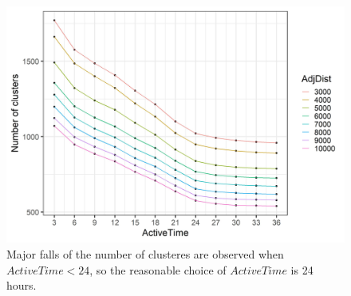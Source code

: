 \begin{Schunk}
\begin{figure}

{\centering \includegraphics[width=0.8\linewidth]{figures/clustering_tuning_2} 

}

\caption[Major falls of the number of clusteres are observed when $ActiveTime < 24$, so the reasonable choice of $ActiveTime$ is 24 hours]{Major falls of the number of clusteres are observed when $ActiveTime < 24$, so the reasonable choice of $ActiveTime$ is 24 hours.}\label{fig:vis2}
\end{figure}
\end{Schunk}




\address{%
Weihao Li\\
Monash University\\%
Econometrics and Business Statistics\\
%
%
%
\\\href{mailto:weihao.li@monash.edu}{\nolinkurl{weihao.li@monash.edu}}
}

\address{%
Emily Dodwell\\
??\\%
line 1\\ line 2\\
%
%
%
\\\href{mailto:emdodwell@gmail.com}{\nolinkurl{emdodwell@gmail.com}}
}

\address{%
Dianne Cook\\
Monash University\\%
Econometrics and Business Statistics\\
%
%
%
\\\href{mailto:dicook@monash.edu}{\nolinkurl{dicook@monash.edu}}
}
